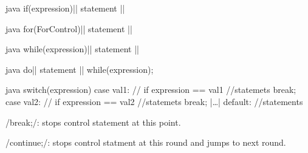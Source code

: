 \begin{sectionbox}[\subsubsection*{If}]\nospacing
  \begin{mintlinebox}{java}
		if(expression)|\optlc| statement |\optrc{}|
  \end{mintlinebox}
\end{sectionbox}
\begin{sectionbox}\nospacing
  \begin{mintlinebox}{java}
		for(ForControl)|\optlc| statement |\optrc|
  \end{mintlinebox}
\end{sectionbox}
\begin{sectionbox}\nospacing
  \begin{mintlinebox}{java}
		while(expression)|\optlc| statement |\optrc|
  \end{mintlinebox}
\end{sectionbox}
\begin{sectionbox}\nospacing
  \begin{mintlinebox}{java}
		do|\optlc| statement |\optrc| while(expression);
  \end{mintlinebox}
\end{sectionbox}
\begin{sectionbox}\nospacing
  \begin{mintlinebox}{java}
switch(expression){
  case val1: // if expression == val1
    //statemets
  break;
  case val2: // if expression == val2
    //statemets
  break;
    |\ldots|
  default:
    //statements
}
  \end{mintlinebox}
\end{sectionbox}
\begin{notebox}[Notes]\nospacing
  \begin{itemizenosep}
      \item \javainline/break;/: stops control statement at this point.
      \item \javainline/continue;/: stops control statment at this round and
    jumps to next round.
  \end{itemizenosep}
\end{notebox}
